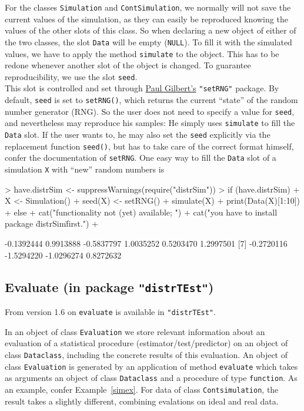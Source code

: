 \documentclass[11pt]{article}
\newcommand{\code}[1]{{\tt #1}}
\newcommand{\pkg}[1]{{\tt "#1"}}
\begin{document}
For the classes \code{Simulation} and \code{ContSimulation}, we normally will
not save the current values of the simulation, as they can easily be reproduced
knowing the values of the other slots of this class.
%
So when declaring a new object of either of the two classes, the slot 
\code{Data} will be empty (\code{NULL}).
To fill it with the simulated values, we have to apply the method 
\code{simulate} to the object. This has to be redone whenever another slot of 
the object is changed.
%
To guarantee reproducibility, we use the slot \code{seed}.\\
%
This slot is controlled and set through 
\href{mailto:pgilbert@bank-banque-canada.ca}{Paul Gilbert's} \pkg{setRNG} 
package.
By default, \code{seed} is set to \code{setRNG()}, which returns the current 
``state'' of the random number generator (RNG). So the user does not need to 
specify a value for \code{seed}, and nevertheless may reproduce his samples: 
He simply uses \code{simulate} to fill the \code{Data} slot.
If the user wants to, he may also set the \code{seed} explicitly via the 
replacement function \code{seed()}, but has to take care of the correct format 
himself, confer the documentation of \code{setRNG}. One easy way to fill 
the \code{Data} slot of a simulation \code{X} with ``new'' random numbers is
\begin{Schunk}
\begin{Sinput}
> have.distrSim <- suppressWarnings(require("distrSim"))
> if (have.distrSim)
+    {X <- Simulation()
+     seed(X) <- setRNG()
+     simulate(X)
+     print(Data(X)[1:10])
+    } else { 
+     cat("\n functionality not (yet) available; ")
+     cat("you have to install package \"distrSim\" first.\n")
+     }
\end{Sinput}
\begin{Soutput}
 [1] -0.1392444  0.9913888 -0.5837797  1.0035252  0.5203470  1.2997501
 [7] -0.2720116 -1.5294220 -1.0296274  0.8272632
\end{Soutput}
\end{Schunk}
%
\subsection[Evaluate (in package distrTEst)]%
{Evaluate (in package \pkg{distrTEst})}\label{evaluate}
%
From version 1.6 on \code{evaluate} is available in  \pkg{distrTEst}.

In an object of class \code{Evaluation}  we store relevant information
about an evaluation of a statistical procedure (estimator/test/predictor)
on an object of class \code{Dataclass}, including the concrete results of
this evaluation. An object of class \code{Evaluation}  is generated by an 
application of method \code{evaluate} which takes as arguments an object of 
class  \code{Dataclass} and a procedure of type \code{function}. As an example, 
confer Example~\ref{simex}.
For data of class \code{Contsimulation}, the result takes a slightly different,
combining evalations on ideal and real data.
%
\end{document}
